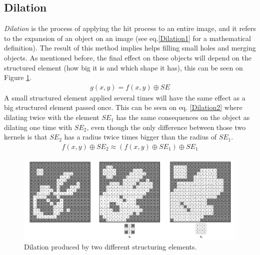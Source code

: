 \subsection{Dilation}
\textit{Dilation} is the process of applying the hit process to an entire image, and it refers to the expansion of an object on an image (see eq.\ref{Dilation1} for a mathematical definition). The result of this method implies helps filling small holes and merging objects. As mentioned before, the final effect on these objects will depend on the structured element (how big it is and which shape it has), this can be seen on Figure \ref{fig:Dilation}. 
\begin{equation}
\begin{aligned}
{g(x, y)}={f(x,y)}\oplus{SE}
\label{Dilation1}
	\end{aligned}
\end{equation}
A small structured element applied several times will have the same effect as a big structured element passed once. This can be seen on eq. \ref{Dilation2} where dilating twice with the element {$SE_{1}$} has the same consequences on the object as dilating one time with {$SE_{2}$}, even though the only difference between those two kernels is that {$SE_{2}$} has a radius twice times bigger than the radius of {$SE_{1}$}.
\begin{equation}
\begin{aligned}
{f(x,y)}\oplus{SE_{2}} \approx ({f(x,y)}\oplus{SE_{1}})\oplus{SE_{1}}
\label{Dilation2}
	\end{aligned}
\end{equation}
\begin{figure}[htbp]
\centering
\includegraphics[width=1\textwidth]{Pictures/Theory/Dilation.png}
\caption{Dilation produced by two different structuring elements.}
\label{fig:Dilation}
\end{figure}

